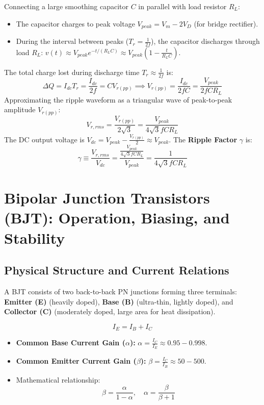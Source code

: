 \begin{derivationbox}
Connecting a large smoothing capacitor $C$ in parallel with load resistor $R_L$:
\begin{itemize}
    \item The capacitor charges to peak voltage $V_{peak} = V_m - 2V_D$ (for bridge rectifier).
    \item During the interval between peaks ($T_r = \frac{1}{2f}$), the capacitor discharges through load $R_L$: $v(t) \approx V_{peak} e^{-t/(R_L C)} \approx V_{peak}\left(1 - \frac{t}{R_L C}\right)$.
\end{itemize}
The total charge lost during discharge time $T_r \approx \frac{1}{2f}$ is:
\begin{equation}
    \Delta Q = I_{dc} T_r = \frac{I_{dc}}{2f} = C V_{r(pp)} \implies V_{r(pp)} = \frac{I_{dc}}{2 f C} = \frac{V_{peak}}{2 f C R_L}
\end{equation}
Approximating the ripple waveform as a triangular wave of peak-to-peak amplitude $V_{r(pp)}$:
\begin{equation}
    V_{r,rms} = \frac{V_{r(pp)}}{2\sqrt{3}} = \frac{V_{peak}}{4\sqrt{3} f C R_L}
\end{equation}
The DC output voltage is $V_{dc} = V_{peak} - \frac{V_{r(pp)}}{2} \approx V_{peak}$. The \textbf{Ripple Factor} $\gamma$ is:
\begin{equation}
    \gamma \equiv \frac{V_{r,rms}}{V_{dc}} = \frac{\frac{V_{peak}}{4\sqrt{3} f C R_L}}{V_{peak}} = \frac{1}{4\sqrt{3} f C R_L}
\end{equation}
\end{derivationbox}

\section{Bipolar Junction Transistors (BJT): Operation, Biasing, and Stability}
\subsection{Physical Structure and Current Relations}
A BJT consists of two back-to-back PN junctions forming three terminals: \textbf{Emitter (E)} (heavily doped), \textbf{Base (B)} (ultra-thin, lightly doped), and \textbf{Collector (C)} (moderately doped, large area for heat dissipation).

\begin{equation}
    I_E = I_B + I_C
\end{equation}
\begin{itemize}
    \item \textbf{Common Base Current Gain ($\alpha$):} $\alpha = \frac{I_C}{I_E} \approx 0.95 - 0.998$.
    \item \textbf{Common Emitter Current Gain ($\beta$):} $\beta = \frac{I_C}{I_B} \approx 50 - 500$.
    \item Mathematical relationship:
    \begin{equation}
        \beta = \frac{\alpha}{1 - \alpha}, \quad \alpha = \frac{\beta}{\beta + 1}
    \end{equation}
\end{itemize}

